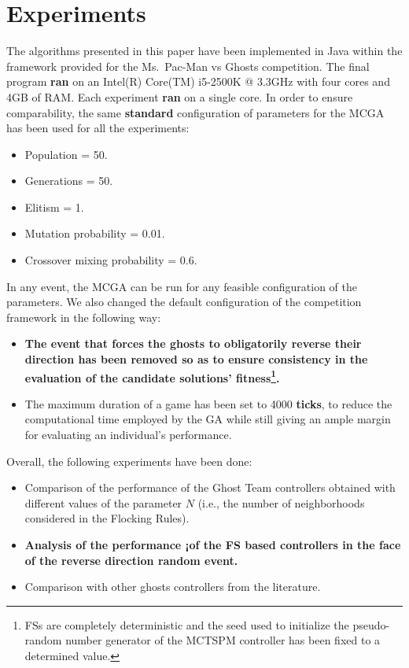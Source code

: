 \documentclass[journal]{IEEEtran}
\begin{document}
\section{Experiments}
\label{sec:Experiments}
The algorithms presented in this paper have been implemented in Java within the framework provided for the Ms.\  Pac-Man vs Ghosts competition. The final program \textbf{ran} on an Intel(R) Core(TM) i5-2500K @ 3.3GHz with four cores and 4GB of RAM. Each experiment \textbf{ran} on a single core. In order to ensure comparability, the same \textbf{standard} configuration of parameters for the MCGA has been used for all the experiments:

\begin{itemize}
  \item Population = 50.
  \item Generations = 50.
  \item Elitism = 1.
  \item Mutation probability = 0.01.
  \item Crossover mixing probability = 0.6.
\end{itemize}

In any event, the MCGA can be run for any feasible configuration of the parameters. We also changed the default configuration of the competition framework in the following way:

\begin{itemize}
  \item \textbf{The event that forces the ghosts to obligatorily reverse their direction has been removed so as to ensure consistency in the evaluation of the candidate solutions' fitness\footnote{FSs are completely deterministic and the seed used to initialize the pseudo-random number generator of the MCTSPM controller has been fixed to a determined value.}.}
  \item The maximum duration of a game has been set to 4000 \textbf{ticks}, to reduce the computational time employed by the GA while still giving an ample margin for evaluating an individual's performance.
\end{itemize}

Overall, the following experiments have been done:

\begin{itemize}
  \item Comparison of the performance of the Ghost Team controllers obtained with different values of the parameter $N$ (i.e., the number of neighborhoods considered in the Flocking Rules).
  \item \textbf{Analysis of the performance ¡of the FS based controllers in the face of the reverse direction random event.}
  \item Comparison with other ghosts controllers from the literature.
\end{itemize}
\end{document}
